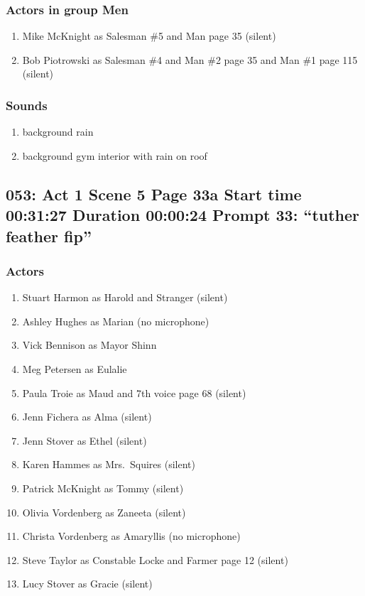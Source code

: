 \subsubsection{Actors in group Men}
\begin{enumerate}
\item Mike McKnight as Salesman \#5 and Man page 35 (silent)
\item Bob Piotrowski as Salesman \#4 and Man \#2 page 35 and Man \#1 page 115 (silent)
\end{enumerate}

\subsubsection{Sounds}
\begin{enumerate}
\item background rain
\item background gym interior with rain on roof
\end{enumerate}
\subsection{053: Act 1 Scene 5 Page 33a Start time 00:31:27 Duration 00:00:24 Prompt 33: ``tuther feather fip''}

\subsubsection{Actors}
\begin{enumerate}
\item Stuart Harmon as Harold and Stranger (silent)
\item Ashley Hughes as Marian (no microphone)
\item Vick Bennison as Mayor Shinn
\item Meg Petersen as Eulalie
\item Paula Troie as Maud and 7th voice page 68 (silent)
\item Jenn Fichera as Alma (silent)
\item Jenn Stover as Ethel (silent)
\item Karen Hammes as Mrs.~Squires (silent)
\item Patrick McKnight as Tommy (silent)
\item Olivia Vordenberg as Zaneeta (silent)
\item Christa Vordenberg as Amaryllis (no microphone)
\item Steve Taylor as Constable Locke and Farmer page 12 (silent)
\item Lucy Stover as Gracie (silent)
\end{enumerate}
